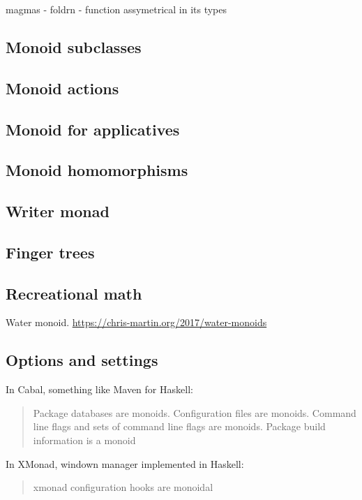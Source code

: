 \documentclass{article}
\begin{document}
        magmas - foldrn - function assymetrical in its types
            

    \subsection{Monoid subclasses}

    \subsection{Monoid actions}

    \subsection{Monoid for applicatives}

    \subsection{Monoid homomorphisms}

    \subsection{Writer monad}

    \subsection{Finger trees}

    \subsection{Recreational math}

    Water monoid. \url{https://chris-martin.org/2017/water-monoids}

    

    \subsection{Options and settings}

    In Cabal, something like Maven for Haskell: 

    \blockquote{Package databases are monoids. Configuration files are monoids. Command line flags and sets of command line flags are monoids. Package build information is a monoid}

    In XMonad, windown manager implemented in Haskell:

    \blockquote{xmonad configuration hooks are monoidal}
\end{document}
